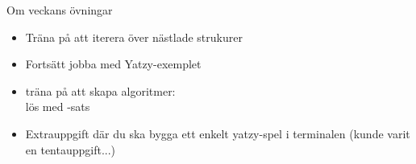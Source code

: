 
\begin{Slide}{Om veckans övningar}\SlideFontSmall
\begin{itemize}
\item Träna på att iterera över nästlade strukurer

\item Fortsätt jobba med Yatzy-exemplet

\item träna på att skapa  algoritmer: \\
lös  med -sats 

\item Extrauppgift där du ska bygga ett enkelt yatzy-spel i terminalen (kunde varit en tentauppgift...)

\end{itemize}
\end{Slide}

%
%
%
%
%
%
%
%


